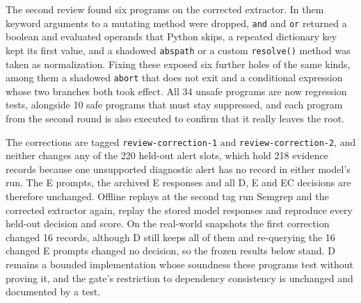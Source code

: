 The second review found six programs on the corrected extractor. In them keyword arguments to a mutating method were dropped, \texttt{and} and \texttt{or} returned a boolean and evaluated operands that Python skips, a repeated dictionary key kept its first value, and a shadowed \texttt{abspath} or a custom \texttt{resolve()} method was taken as normalization. Fixing these exposed six further holes of the same kinds, among them a shadowed \texttt{abort} that does not exit and a conditional expression whose two branches both took effect. All 34 unsafe programs are now regression tests, alongside 10 safe programs that must stay suppressed, and each program from the second round is also executed to confirm that it really leaves the root.

The corrections are tagged \texttt{review-correction-1} and \texttt{review-correction-2}, and neither changes any of the 220 held-out alert slots, which hold 218 evidence records because one unsupported diagnostic alert has no record in either model's run. The E prompts, the archived E responses and all D, E and EC decisions are therefore unchanged. Offline replays at the second tag run Semgrep and the corrected extractor again, replay the stored model responses and reproduce every held-out decision and score. On the real-world snapshots the first correction changed 16 records, although D still keeps all of them and re-querying the 16 changed E prompts changed no decision, so the frozen results below stand. D remains a bounded implementation whose soundness these programs test without proving it, and the gate's restriction to dependency consistency is unchanged and documented by a test.
